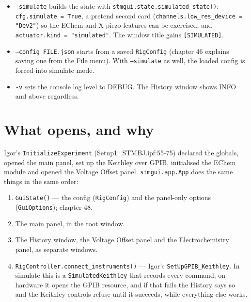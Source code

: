 \begin{itemize}[leftmargin=*]
\item \texttt{--simulate} builds the state with \texttt{stmgui.\discretionary{}{}{}state.\discretionary{}{}{}simulated\_\discretionary{}{}{}state()}: \texttt{cfg.\discretionary{}{}{}simulate = True}, a pretend second card (\texttt{channels.\discretionary{}{}{}low\_\discretionary{}{}{}res\_\discretionary{}{}{}device = "Dev2"}) so the EChem and X-piezo features can be exercised, and \texttt{actuator.\discretionary{}{}{}kind = "simulated"}. The window title gains \texttt{[SIMULATED]}.
\item \texttt{--config FILE.\discretionary{}{}{}json} starts from a saved \texttt{Rig\discretionary{}{}{}Config} (chapter 46 explains saving one from the File menu). With \texttt{--simulate} as well, the loaded config is forced into simulate mode.
\item \texttt{-v} sets the console log level to DEBUG. The History window shows INFO and above regardless.
\end{itemize}

\section{What opens, and why}

Igor's \texttt{Initialize\discretionary{}{}{}Experiment} (Setup1\_STMBJ.ipf:55-75) declared the globals, opened the main panel, set up the Keithley over GPIB, initialised the EChem module and opened the Voltage Offset panel. \texttt{stmgui.\discretionary{}{}{}app.\discretionary{}{}{}App} does the same things in the same order:

\begin{enumerate}[leftmargin=*]
\item \texttt{Gui\discretionary{}{}{}State()} --- the config (\texttt{Rig\discretionary{}{}{}Config}) and the panel-only options (\texttt{Gui\discretionary{}{}{}Options}); chapter 48.
\item The main panel, in the root window.
\item The History window, the Voltage Offset panel and the Electrochemistry panel, as separate windows.
\item \texttt{Rig\discretionary{}{}{}Controller.\discretionary{}{}{}connect\_\discretionary{}{}{}instruments()} --- Igor's \texttt{Set\discretionary{}{}{}Up\discretionary{}{}{}GPIB\_\discretionary{}{}{}Keithley}. In simulate this is a \texttt{Simulated\discretionary{}{}{}Keithley} that records every command; on hardware it opens the GPIB resource, and if that fails the History says so and the Keithley controls refuse until it succeeds, while everything else works.
\end{enumerate}

